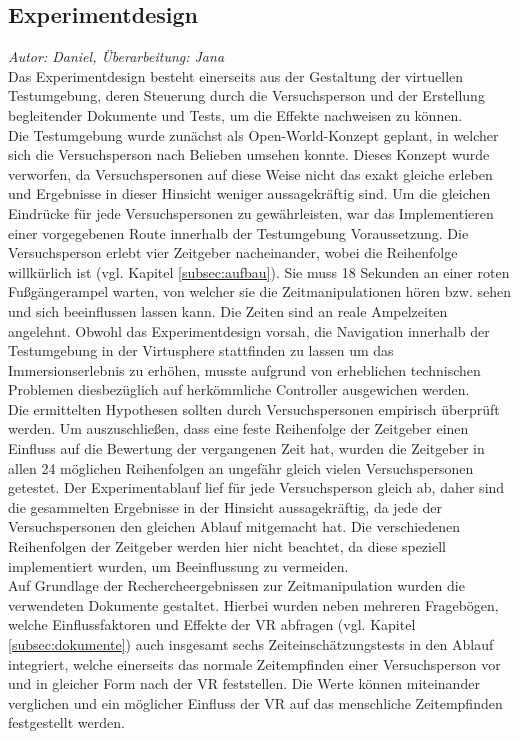 \documentclass{Bericht}
\begin{document}
\subsection{Experimentdesign}
\textit{Autor: Daniel, Überarbeitung: Jana}\\
Das Experimentdesign besteht einerseits aus der Gestaltung der virtuellen Testumgebung, deren Steuerung durch die Versuchsperson und der Erstellung begleitender Dokumente und Tests, um die Effekte nachweisen zu können.\\
Die Testumgebung wurde zunächst als Open-World-Konzept geplant, in welcher sich die Versuchsperson nach Belieben umsehen konnte. Dieses Konzept wurde verworfen, da Versuchspersonen auf diese Weise nicht das exakt gleiche erleben und Ergebnisse in dieser Hinsicht weniger aussagekräftig sind. Um die gleichen Eindrücke für jede Versuchspersonen zu gewährleisten, war das Implementieren einer vorgegebenen Route innerhalb der Testumgebung Voraussetzung. Die Versuchsperson erlebt vier Zeitgeber nacheinander, wobei die Reihenfolge willkürlich ist (vgl. Kapitel \ref{subsec:aufbau}). Sie muss 18 Sekunden an einer roten Fußgängerampel warten, von welcher sie die Zeitmanipulationen hören bzw. sehen und sich beeinflussen lassen kann. Die Zeiten sind an reale Ampelzeiten angelehnt.
	Obwohl das Experimentdesign vorsah, die Navigation innerhalb der Testumgebung in der Virtusphere stattfinden zu lassen um das Immersionserlebnis zu erhöhen, musste aufgrund von erheblichen technischen Problemen diesbezüglich auf herkömmliche Controller ausgewichen werden.\\
	Die ermittelten Hypothesen sollten durch Versuchspersonen empirisch überprüft werden. Um auszuschließen, dass eine feste Reihenfolge der Zeitgeber einen Einfluss auf die Bewertung der vergangenen Zeit hat, wurden die Zeitgeber in allen 24 möglichen Reihenfolgen an ungefähr gleich vielen Versuchspersonen getestet. Der Experimentablauf lief für jede Versuchsperson gleich ab, daher sind die gesammelten Ergebnisse in der Hinsicht aussagekräftig, da jede der Versuchspersonen den gleichen Ablauf mitgemacht hat. Die verschiedenen Reihenfolgen der Zeitgeber werden hier nicht beachtet, da diese speziell implementiert wurden, um Beeinflussung zu vermeiden.\\
Auf Grundlage der Rechercheergebnissen zur Zeitmanipulation wurden die verwendeten Dokumente gestaltet. Hierbei wurden neben mehreren Fragebögen, welche Einflussfaktoren und Effekte der VR abfragen		 (vgl. Kapitel \ref{subsec:dokumente}) auch insgesamt sechs Zeiteinschätzungstests in den Ablauf integriert,
welche einerseits das normale Zeitempfinden einer Versuchsperson vor und in gleicher Form nach der VR feststellen. Die Werte können miteinander verglichen und ein möglicher Einfluss der VR auf das menschliche Zeitempfinden festgestellt werden.\\
\end{document}
